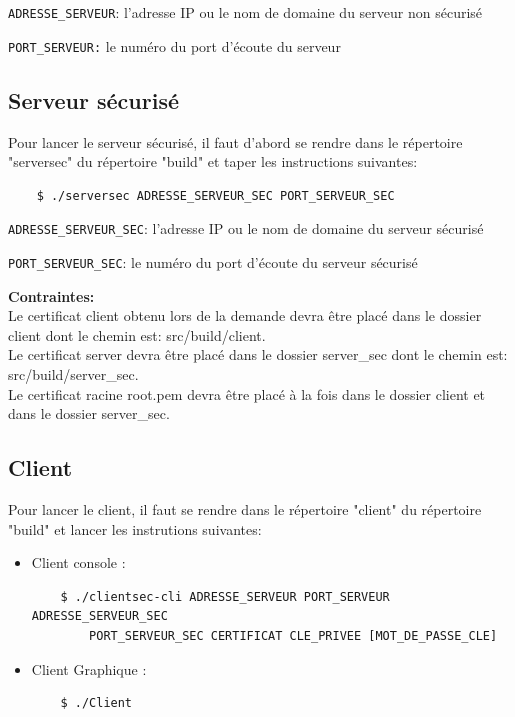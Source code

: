 \documentclass[a4paper,11pt,french]{book}
\begin{document}
\verb+ADRESSE_SERVEUR+: l'adresse IP ou le nom de domaine du serveur non sécurisé

\verb+PORT_SERVEUR:+ le numéro du port d'écoute du serveur

\subsection{Serveur sécurisé}
Pour lancer le serveur sécurisé, il faut d'abord se rendre dans le répertoire "serversec" du répertoire "build" et taper les instructions suivantes:
\begin{verbatim}
    $ ./serversec ADRESSE_SERVEUR_SEC PORT_SERVEUR_SEC
\end{verbatim}

\verb+ADRESSE_SERVEUR_SEC+: l'adresse IP ou le nom de domaine du serveur sécurisé

\verb+PORT_SERVEUR_SEC+: le numéro du port d'écoute du serveur sécurisé
\\
\vspace{1.4cm}

\textbf{Contraintes:}\\ Le certificat client obtenu lors de la demande devra être placé dans le dossier client dont le chemin est: src/build/client.\\
Le certificat server devra être placé dans le dossier server\_sec dont le chemin est: src/build/server\_sec.\\
Le certificat racine root.pem devra être placé à la fois dans le dossier client et dans le dossier server\_sec.

\subsection{Client}
Pour lancer le client, il faut se rendre dans le répertoire "client" du répertoire "build" et lancer les instrutions suivantes:
\begin{itemize}
\item Client console : 
\begin{verbatim}
    $ ./clientsec-cli ADRESSE_SERVEUR PORT_SERVEUR ADRESSE_SERVEUR_SEC 
        PORT_SERVEUR_SEC CERTIFICAT CLE_PRIVEE [MOT_DE_PASSE_CLE] 
\end{verbatim}
\item Client Graphique :
\begin{verbatim}
    $ ./Client
\end{verbatim}
\end{itemize}
\end{document}
